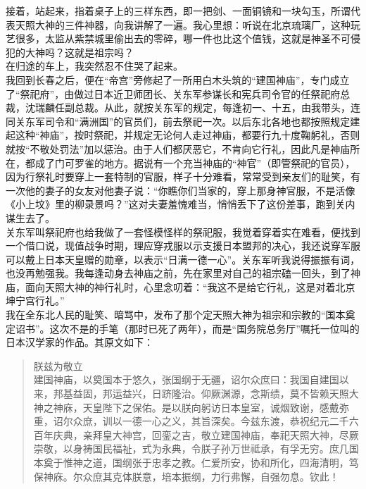 接着，站起来，指着桌子上的三样东西，即一把剑、一面铜镜和一块勾玉，所谓代表天照大神的三件神器，向我讲解了一遍。我心里想：听说在北京琉璃厂，这种玩艺很多，太监从紫禁城里偷出去的零碎，哪一件也比这个值钱，这就是神圣不可侵犯的大神吗？这就是祖宗吗？\\

在归途的车上，我突然忍不住哭了起来。\\

我回到长春之后，便在“帝宫”旁修起了一所用白木头筑的“建国神庙”，专门成立了“祭祀府”，由做过日本近卫师团长、关东军参谋长和宪兵司令官的任祭祀府总裁，沈瑞麟任副总裁。从此，就按关东军的规定，每逢初一、十五，由我带头，连同关东军司令和“满洲国”的官员们，前去祭祀一次。以后东北各地也都按照规定建起这种“神庙”，按时祭祀，并规定无论何人走过神庙，都要行九十度鞠躬礼，否则就按“不敬处罚法”加以惩治。由于人们都厌恶它，不肯向它行礼，因此凡是神庙所在，都成了门可罗雀的地方。据说有一个充当神庙的“神官”（即管祭祀的官员），因为行祭礼时要穿上一套特制的官服，样子十分难看，常常受到亲友们的耻笑，有一次他的妻子的女友对他妻子说：“你瞧你们当家的，穿上那身神官服，不是活像《小上坟》里的柳录景吗？”这对夫妻羞愧难当，悄悄丢下了这份差事，跑到关内谋生去了。\\

关东军叫祭祀府也给我做了一套怪模怪样的祭祀服，我觉着穿着实在难看，便找到一个借口说，现值战争时期，理应穿戎服以示支援日本盟邦的决心，我还说穿军服可以戴上日本天皇赠的勋章，以表示“日满一德一心”。关东军听我说得振振有词，也没再勉强我。我每逢动身去神庙之前，先在家里对自己的祖宗磕一回头，到了神庙，面向天照大神的神行礼时，心里念叨着：“我这不是给它行礼，这是对着北京坤宁宫行礼。”\\

我在全东北人民的耻笑、暗骂中，发布了那个定天照大神为祖宗和宗教的“国本奠定诏书”。这次不是的手笔（那时已死了两年），而是“国务院总务厅”嘱托一位叫的日本汉学家的作品。其原文如下：\\

\begin{quote}
	朕兹为敬立\\

建国神庙，以奠国本于悠久，张国纲于无疆，诏尔众庶曰：我国自建国以来，邦基益固，邦运益兴，日跻隆治。仰厥渊源，念斯绩，莫不皆赖天照大神之神庥，天皇陛下之保佑。是以朕向躬访日本皇室，诚烟致谢，感戴弥重，诏尔众庶，训以一德一心之义，其旨深矣。今兹东渡，恭祝纪元二千六百年庆典，亲拜皇大神宫，回銮之吉，敬立建国神庙，奉祀天照大神，尽厥崇敬，以身祷国民福祉，式为永典，令朕子孙万世祗承，有孚无穷。庶几国本奠于惟神之道，国纲张于忠孝之教。仁爱所安，协和所化，四海清明，笃保神庥。尔众庶其克体朕意，培本振纲，力行弗懈，自强勿息。钦此！\\
\end{quote}

